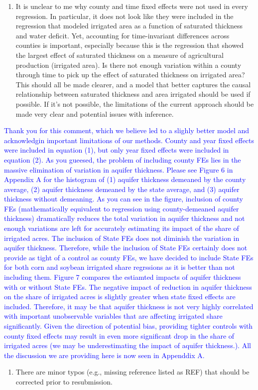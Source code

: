 \documentclass[
]{article}
\providecommand{\tightlist}{%
  \setlength{\itemsep}{0pt}\setlength{\parskip}{0pt}}
\begin{document}
\begin{enumerate}
\def\labelenumi{\arabic{enumi}.}
\setcounter{enumi}{2}
\tightlist
\item
  It is unclear to me why county and time fixed effects were not used in
  every regression. In particular, it does not look like they were
  included in the regression that modeled irrigated area as a function
  of saturated thickness and water deficit. Yet, accounting for
  time-invariant differences across counties is important, especially
  because this is the regression that showed the largest effect of
  saturated thickness on a measure of agricultural production (irrigated
  area). Is there not enough variation within a county through time to
  pick up the effect of saturated thickness on irrigated area? This
  should all be made clearer, and a model that better captures the
  causal relationship between saturated thickness and area irrigated
  should be used if possible. If it's not possible, the limitations of
  the current approach should be made very clear and potential issues
  with inference.
\end{enumerate}

\textcolor{blue}{Thank you for this comment, which we believe led to a slighly better model and acknowledgin important limitations of our methods. County and year fixed effects were included in equation (1), but only year fixed effects were included in equation (2). As you gueesed, the problem of including county FEs lies in the massive elimination of variation in aquifer thickness. Please see Figure 6 in Appendix A for the histogram of (1) aquifer thickness demeaned by the county average, (2) aquifer thickness demeaned by the state average, and (3) aquifer thickness without demeaning. As you can see in the figure, inclusion of county FEs (mathematically equivalent to regression using county-demeaned aquifer thickness) dramatically reduces the total variation in aquifer thickness and not enough variations are left for accurately estimating its impact of the share of irrigated acres. The inclusion of State FEs does not diminish the variation in aquifer thickness. Therefore, while the inclusion of State FEs certainly does not provide as tight of a control as county FEs, we have decided to include State FEs for both corn and soybean irrigated share regrssions as it is better than not including them. Figure 7 compares the estiamted impacts of aquifer thickness with or without State FEs. The negative impact of reduction in aquifer thickness on the share of irrigated acres is slightly greater when state fixed effects are included. Therefore, it may be that aquifer thickness is not very highly correlated with important unobservable variables that are affecting irrigated share significantly. Given the direction of potential bias, providing tighter controls with county fixed effects may result in even more significant drop in the share of irrigated acres (we may be underestimating the impact of aquifer thickness.). All the discussion we are providing here is now seen in Appenddix A.
}

\begin{enumerate}
\def\labelenumi{\arabic{enumi}.}
\setcounter{enumi}{3}
\tightlist
\item
  There are minor typos (e.g., missing reference listed as REF) that
  should be corrected prior to resubmission.
\end{enumerate}

\textcolor{blue}{}
\end{document}
